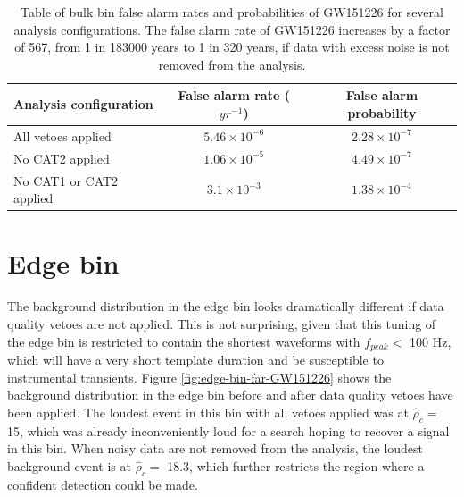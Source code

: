 \begin{table}[!ht]%
  \begin{center}
    \begin{tabular}{lcc}
      \hline
      Analysis configuration & False alarm rate ($yr^{-1}$) & False alarm probability \\ \hline
      All vetoes applied & $5.46\times10^{-6}$  & $2.28\times10^{-7}$ \\
      No CAT2 applied & $1.06\times10^{-5}$ & $4.49\times10^{-7}$ \\
      No CAT1 or CAT2 applied & $3.1\times10^{-3}$ & $1.38\times10^{-4}$ \\ \hline
    \end{tabular}
  \end{center}
  \caption[GW151226 FAR]{Table of bulk bin false alarm rates and probabilities of GW151226 for several analysis %
           configurations. The false alarm rate of GW151226 increases by a factor %
           of 567, from 1 in 183000 years to 1 in 320 years, if data with excess noise %
           is not removed from the analysis.}
  \label{table:GW151226-far}
\end{table}

\section{Edge bin}

The background distribution in the edge bin looks dramatically different if data quality
vetoes are not applied. This is not surprising, given that this tuning of the edge bin
is restricted to contain the shortest waveforms with $f_{peak} <$ 100 Hz, which
will have a very short template duration and be susceptible to instrumental transients.
Figure \ref{fig:edge-bin-far-GW151226} shows the background distribution in the edge bin
before and after data quality vetoes have been applied.
The loudest event in this bin with all vetoes applied was at $\hat{\rho}_{c} =$ 15,
which was already inconveniently loud for a search hoping to recover a signal in this
bin. When noisy data are not removed from the analysis, the loudest background event is at
$\hat{\rho}_{c} =$ 18.3, which further restricts the region where a confident
detection could be made.

